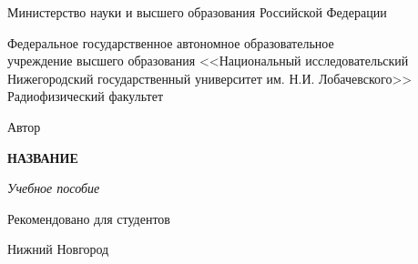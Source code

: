 
\begin{titlepage}


 
\begin{center}
Министерство науки и высшего образования Российской Федерации
\end{center}
\vskip 20pt
\begin{center}
Федеральное государственное автономное образовательное\\
учреждение высшего образования 
<<Национальный исследовательский Нижегородский государственный университет им. Н.И. Лобачевского>>\\[10pt]
Радиофизический факультет
\end{center}
\vskip 100pt
\begin{center}
	{Автор}
	\vspace{7pt}
\end{center}
\begin{center}
	{\bf \Large НАЗВАНИЕ}
\end{center}
\vskip 20pt
\begin{center}
	\it Учебное пособие
\end{center}
\vskip 20pt
\begin{center}
\fontsize{13pt}{1em}\selectfont
Рекомендовано для студентов
\end{center}

\vfill
\begin{center}
	Нижний Новгород\\
	\currentyear
\end{center}
\vspace{40pt}

\end{titlepage}
